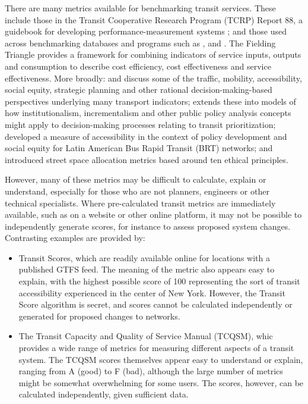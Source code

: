 \documentclass[preprint, 3p,
authoryear]{elsarticle} %
\begin{document}
There are many metrics available for benchmarking transit services.
These include those in the Transit Cooperative Research Program (TCRP)
Report 88, a guidebook for developing performance-measurement systems
\citep{Ryus:2003aa}; and those used across benchmarking databases and
programs such as \citet{Florida-Transit-Information-System:2018aa},
\citet{UITP:2015aa} and \citet{Imperial-College-London:2023aa}. The
Fielding Triangle \citep{FieldingGordonJ1987Mpts} provides a framework
for combining indicators of service inputs, outputs and consumption to
describe cost efficiency, cost effectiveness and service effectiveness.
More broadly: \citet{Litman:2003ab} and \citet{Litman:2016aa} discuss
some of the traffic, mobility, accessibility, social equity, strategic
planning and other rational decision-making-based perspectives
underlying many transport indicators; \citet{Reynolds:2017ah} extends
these into models of how institutionalism, incrementalism and other
public policy analysis concepts might apply to decision-making processes
relating to transit prioritization; \citet{GuzmanLuisA.2017Aeit}
developed a measure of accessibility in the context of policy
development and social equity for Latin American Bus Rapid Transit (BRT)
networks; and \citet{Creutzig2020streetspaceallocation} introduced
street space allocation metrics based around ten ethical principles.

However, many of these metrics may be difficult to calculate, explain or
understand, especially for those who are not planners, engineers or
other technical specialists. Where pre-calculated transit metrics are
immediately available, such as on a website or other online platform, it
may not be possible to independently generate scores, for instance to
assess proposed system changes. Contrasting examples are provided by:

\begin{itemize}
\item
  Transit Scores\citep{WalkScore:2023tg}, which are readily available
  online for locations with a published GTFS feed. The meaning of the
  metric also appears easy to explain, with the highest possible score
  of 100 representing the sort of transit accessibility experienced in
  the center of New York. However, the Transit Score algorithm is
  secret, and scores cannot be calculated independently or generated for
  proposed changes to networks.
\item
  The Transit Capacity and Quality of Service Manual (TCQSM), whic
  provides a wide range of metrics for measuring different aspects of a
  transit system. The TCQSM scores themselves appear easy to understand
  or explain, ranging from A (good) to F (bad), although the large
  number of metrics might be somewhat overwhelming for some users. The
  scores, however, can be calculated independently, given sufficient
  data.
\end{itemize}
\end{document}

